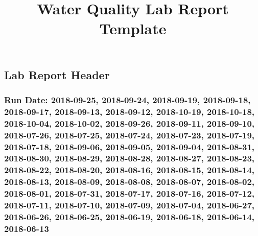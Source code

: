 \documentclass[
  letterpaper,
  DIV=11,
  numbers=noendperiod]{scrartcl}
\title{Water Quality Lab Report Template}
\author{}
\date{}
\renewcommand*\contentsname{Table of contents}
\newcommand\contentsname{Table of contents}
\begin{document}
\maketitle
\ifdefined\Shaded\renewenvironment{Shaded}{\begin{tcolorbox}[interior hidden, breakable, boxrule=0pt, borderline west={3pt}{0pt}{shadecolor}, enhanced, sharp corners, frame hidden]}{\end{tcolorbox}}\fi

\renewcommand*\contentsname{Table of contents}
{
\hypersetup{linkcolor=}
\setcounter{tocdepth}{3}
\tableofcontents
}
\hypertarget{lab-report-header}{%
\subsection{Lab Report Header}\label{lab-report-header}}

\hypertarget{run-date-2018-09-25-2018-09-24-2018-09-19-2018-09-18-2018-09-17-2018-09-13-2018-09-12-2018-10-19-2018-10-18-2018-10-04-2018-10-02-2018-09-26-2018-09-11-2018-09-10-2018-07-26-2018-07-25-2018-07-24-2018-07-23-2018-07-19-2018-07-18-2018-09-06-2018-09-05-2018-09-04-2018-08-31-2018-08-30-2018-08-29-2018-08-28-2018-08-27-2018-08-23-2018-08-22-2018-08-20-2018-08-16-2018-08-15-2018-08-14-2018-08-13-2018-08-09-2018-08-08-2018-08-07-2018-08-02-2018-08-01-2018-07-31-2018-07-17-2018-07-16-2018-07-12-2018-07-11-2018-07-10-2018-07-09-2018-07-04-2018-06-27-2018-06-26-2018-06-25-2018-06-19-2018-06-18-2018-06-14-2018-06-13}{%
\subsubsection{Run Date: 2018-09-25, 2018-09-24, 2018-09-19, 2018-09-18,
2018-09-17, 2018-09-13, 2018-09-12, 2018-10-19, 2018-10-18, 2018-10-04,
2018-10-02, 2018-09-26, 2018-09-11, 2018-09-10, 2018-07-26, 2018-07-25,
2018-07-24, 2018-07-23, 2018-07-19, 2018-07-18, 2018-09-06, 2018-09-05,
2018-09-04, 2018-08-31, 2018-08-30, 2018-08-29, 2018-08-28, 2018-08-27,
2018-08-23, 2018-08-22, 2018-08-20, 2018-08-16, 2018-08-15, 2018-08-14,
2018-08-13, 2018-08-09, 2018-08-08, 2018-08-07, 2018-08-02, 2018-08-01,
2018-07-31, 2018-07-17, 2018-07-16, 2018-07-12, 2018-07-11, 2018-07-10,
2018-07-09, 2018-07-04, 2018-06-27, 2018-06-26, 2018-06-25, 2018-06-19,
2018-06-18, 2018-06-14,
2018-06-13}\label{run-date-2018-09-25-2018-09-24-2018-09-19-2018-09-18-2018-09-17-2018-09-13-2018-09-12-2018-10-19-2018-10-18-2018-10-04-2018-10-02-2018-09-26-2018-09-11-2018-09-10-2018-07-26-2018-07-25-2018-07-24-2018-07-23-2018-07-19-2018-07-18-2018-09-06-2018-09-05-2018-09-04-2018-08-31-2018-08-30-2018-08-29-2018-08-28-2018-08-27-2018-08-23-2018-08-22-2018-08-20-2018-08-16-2018-08-15-2018-08-14-2018-08-13-2018-08-09-2018-08-08-2018-08-07-2018-08-02-2018-08-01-2018-07-31-2018-07-17-2018-07-16-2018-07-12-2018-07-11-2018-07-10-2018-07-09-2018-07-04-2018-06-27-2018-06-26-2018-06-25-2018-06-19-2018-06-18-2018-06-14-2018-06-13}}
\end{document}
